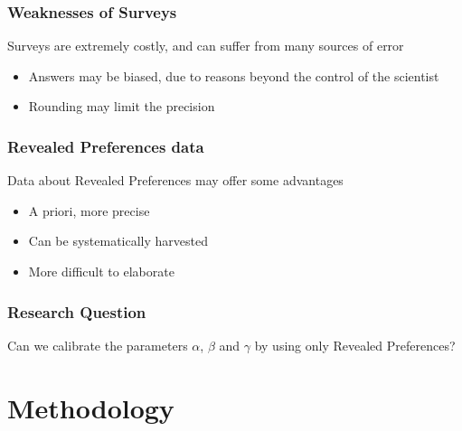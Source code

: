 \documentclass[hyperref={pdfpagelabels=false}]{beamer}
\begin{document}
\begin{frame}
  \frametitle{Weaknesses of Surveys}
  Surveys are extremely costly, and can suffer from many sources of error
  \begin{itemize}
  \item<2-> Answers may be biased, due to reasons beyond the control of the scientist
  \item<3-> Rounding may limit the precision
  \end{itemize}

\end{frame}
\begin{frame}
  \frametitle{Revealed Preferences data}
  Data about Revealed Preferences may offer some advantages
  \begin{itemize}
  \item<2-> A priori, more precise
  \item<3-> Can be systematically harvested
  \item<4-> More difficult to elaborate
  \end{itemize}
\end{frame}

\begin{frame}
  \frametitle{Research Question}
  Can we calibrate the parameters \(\alpha\), \(\beta\) and \(\gamma\) by using only Revealed Preferences?
\end{frame}

\section{Methodology}
\begin{frame}
  \tableofcontents[currentsection]
\end{frame}
\end{document}
